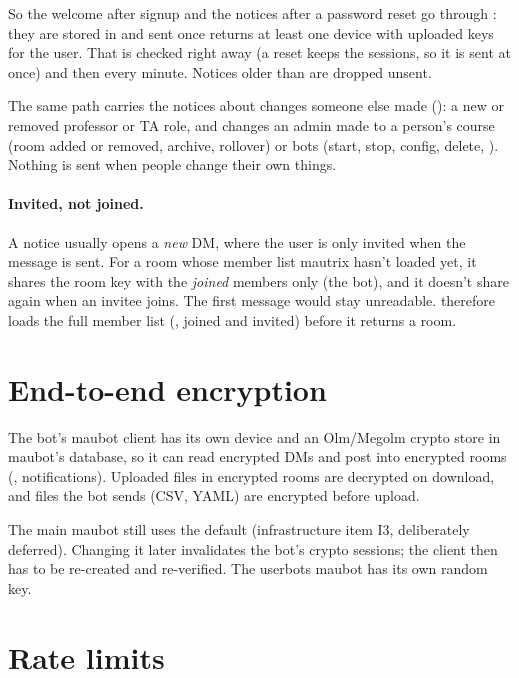 So the welcome after signup and the notices after a password reset go through
: they are stored in  and sent once
 returns at least one device with uploaded keys for
the user. That is checked right away (a  reset keeps the sessions, so it is
sent at once) and then every minute. Notices older than  are
dropped unsent.

The same path carries the notices about changes someone else made (): a new
or removed professor or TA role, and changes an admin made to a person's course (room added or
removed, archive, rollover) or bots (start, stop, config, delete, ). Nothing
is sent when people change their own things.

\paragraph{Invited, not joined.} A notice usually opens a \emph{new} DM, where the user is
only invited when the message is sent. For a room whose member list mautrix hasn't loaded yet,
it shares the room key with the \emph{joined} members only (the bot), and it doesn't share
again when an invitee joins. The first message would stay unreadable. 
therefore loads the full member list (, joined and invited) before it
returns a room.

\section{End-to-end encryption}

The bot's maubot client has its own device and an Olm/Megolm crypto store in maubot's
database, so it can read encrypted DMs and post into encrypted rooms (,
notifications). Uploaded files in encrypted rooms are decrypted on download, and files the
bot sends (CSV, YAML) are encrypted before upload.

\begin{warning}
The main maubot still uses the default  (infrastructure item I3,
deliberately deferred). Changing it later invalidates the bot's crypto sessions; the client
then has to be re-created and re-verified. The userbots maubot has its own random key.
\end{warning}

\section{Rate limits}

